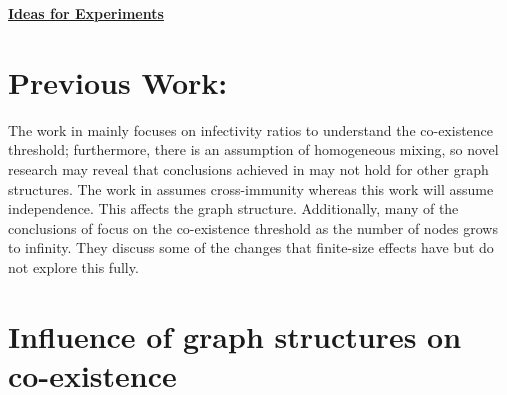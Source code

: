 \documentclass[11pt]{article}
\begin{document}
\newtheorem{theorem}{Theorem}[section]
\newtheorem{lemma}{Lemma}[section]
\newtheorem{corollary}{Corollary}[section]
\newtheorem{fact}{Fact}[section]
\newtheorem{definition}{Definition}[section]
\newtheorem{proposition}{Proposition}[section]
\newtheorem{observation}{Observation}[section]
\newtheorem{claim}{Claim}[section]

\newcommand{\cnp}{\textbf{NP}}
\newcommand{\true}{\texttt{True}}
\newcommand{\false}{\texttt{False}}

\newcommand{\QED}{\hfill\rule{2mm}{2mm}}

\newcommand{\irange}{\mbox{$1 \leq i \leq n$}}
\newcommand{\jrange}{\mbox{$1 \leq j \leq m$}}

\newcommand{\dunder}[1]{\underline{\underline{#1}}}

\setlength{\parskip}{3pt}

\normalbaselineskip

\newcommand{\cone}{\mbox{$\mathcal{C}_1$}}
\newcommand{\ctwo}{\mbox{$\mathcal{C}_2$}}


\newcommand{\sstate}{\mbox{$\mathbb{S}$}}
\newcommand{\istate}{\mbox{$\mathbb{I}$}}
\newcommand{\rstate}{\mbox{$\mathbb{R}$}}

\begin{center}
\dunder{\Large{\textbf{Ideas for Experiments}}}
\end{center}


\medskip

\section{Previous Work:}
The work in \cite{Beutel_Interacting} mainly focuses on infectivity ratios to understand the co-existence threshold; furthermore, there is an assumption of homogeneous mixing, so novel research may reveal that conclusions achieved in \cite{10.1145/2339530.2339601} may not hold for other graph structures. The work in \cite{Karrer_2011} assumes cross-immunity whereas this work will assume independence. This affects the graph structure. Additionally, many of the conclusions of \cite{Karrer_2011} focus on the co-existence threshold as the number of nodes grows to infinity. They discuss some of the changes that finite-size effects have but do not explore this fully.

\section{Influence of graph structures on co-existence} 
\end{document}
